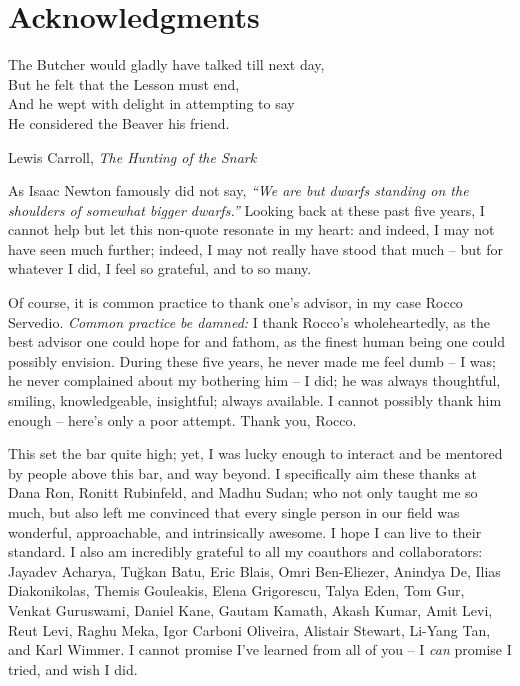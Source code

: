 \cleartorecto %
\chapter{Acknowledgments} %
\thispagestyle{plain} %

\epigraph{The Butcher would gladly have talked till next day,\\
But he felt that the Lesson must end,\\
And he wept with delight in attempting to say\\
He considered the Beaver his friend.}{Lewis Carroll, \textit{The Hunting of the Snark}}

As Isaac Newton famously did not say, \emph{``We are but dwarfs standing on the shoulders of somewhat bigger dwarfs.''} Looking back at these past five years, I cannot help but let this non-quote resonate in my heart: and indeed, I may not have seen much further; indeed, I may not really have stood that much -- but for whatever I did, I feel so grateful, and to so many. 

Of course, it is common practice to thank one's advisor, in my case Rocco Servedio. \emph{Common practice be damned:} I thank Rocco's wholeheartedly, as the best advisor one could hope for and fathom, as the finest human being one could possibly envision. During these five years, he never made me feel dumb -- I was; he never complained about my bothering him -- I did; he was always thoughtful, smiling, knowledgeable, insightful; always available. I cannot possibly thank him enough -- here's only a poor attempt. Thank you, Rocco.

This set the bar quite high; yet, I was lucky enough to interact and be mentored by people above this bar, and way beyond. I specifically aim these thanks at Dana Ron, Ronitt Rubinfeld, and Madhu Sudan; who not only taught me so much, but also left me convinced that every single person in our field was wonderful, approachable, and intrinsically awesome. I hope I can live to their standard. I also am incredibly grateful to all my coauthors and collaborators: Jayadev Acharya, Tu\u{g}kan Batu, Eric Blais, Omri Ben-Eliezer, Anindya De, Ilias Diakonikolas, Themis Gouleakis, Elena Grigorescu, Talya Eden, Tom Gur, Venkat Guruswami, Daniel Kane, Gautam Kamath, Akash Kumar, Amit Levi, Reut Levi, Raghu Meka, Igor Carboni Oliveira, Alistair Stewart, Li-Yang Tan, and Karl Wimmer. I cannot promise I've learned from all of you -- I \emph{can} promise I tried, and wish I did.

